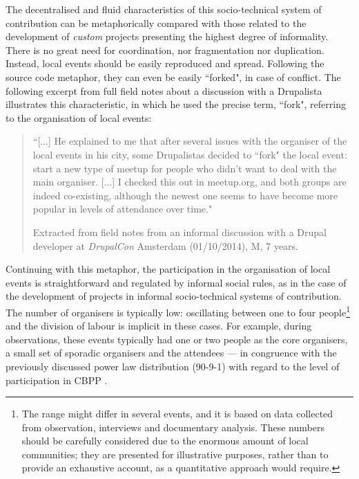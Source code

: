 The decentralised and fluid characteristics of this socio-technical system of contribution can be metaphorically compared with those related to the development of \textit{custom} projects presenting the highest degree of informality. There is no great need for coordination, nor fragmentation nor duplication. Instead, local events should be easily reproduced and spread. Following the source code metaphor, they can even be easily ``forked", in case of conflict. The following excerpt from full field notes about a discussion with a Drupalista illustrates this characteristic, in which he used the precise term, ``fork", referring to the organisation of local events:

\begin{quotation}
``[...] He explained to me that after several issues with the organiser of the local events in his city, some Drupalistas decided to ``fork" the local event: start a new type of meetup for people who didn't want to deal with the main organiser. [...] I checked this out in meetup.org, and both groups are indeed co-existing, although the newest one seems to have become more popular in levels of attendance over time."

\begin{flushright}\footnotesize{Extracted from field notes from an informal discussion with a Drupal developer at \textit{DrupalCon} Amsterdam (01/10/2014), M, 7 years.}\end{flushright}
\end{quotation}

Continuing with this metaphor, the participation in the organisation of local events is straightforward and regulated by informal social rules, as in the case of the development of projects in informal socio-technical systems of contribution. The number of organisers is typically low: oscillating between one to four people\footnote{\label{fn-data} The range might differ in several events, and it is based on data collected from observation, interviews and documentary analysis. These numbers should be carefully considered due to the enormous amount of local communities; they are presented for illustrative purposes, rather than to provide an exhaustive account, as a quantitative approach would require.} and the division of labour is implicit in these cases. For example, during observations, these events typically had one or two people as the core organisers, a small set of sporadic organisers and the attendees --- in congruence with the previously discussed power law distribution (90-9-1) with regard to the level of participation in CBPP \parencite{p2pvalue-del12:Online}.

